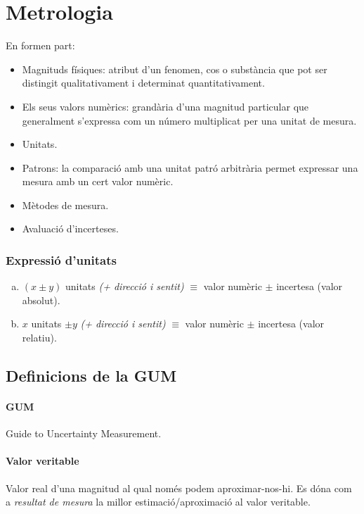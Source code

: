\section{Metrologia}
En formen part:
\begin{itemize}
    \item Magnituds físiques: atribut d’un fenomen, cos o substància que pot ser distingit qualitativament i determinat quantitativament.
    \item Els seus valors numèrics: grandària d’una magnitud particular que generalment s'expressa com un número multiplicat per una unitat de mesura.
    \item Unitats.
    \item Patrons: la comparació amb una unitat patró arbitrària permet expressar una mesura amb un cert valor numèric.
    \item Mètodes de mesura.
    \item Avaluació d'incerteses.
\end{itemize}

\subsubsection*{Expressió d'unitats}
\begin{enumerate}[a)]
  \item $(x \pm y)$ unitats \emph{(+ direcció i sentit)} $\equiv$ valor numèric $\pm$ incertesa (valor absolut).
  \item $x$ unitats $\pm y$ \emph{(+ direcció i sentit)} $\equiv$ valor numèric $\pm$ incertesa (valor relatiu).
\end{enumerate}

\subsection{Definicions de la GUM}
\paragraph{GUM}
Guide to Uncertainty Measurement.

\paragraph{Valor veritable}
Valor real d'una magnitud al qual només podem aproximar-nos-hi. Es dóna com a {\it resultat de mesura\/} la millor estimació/aproximació al valor veritable.


